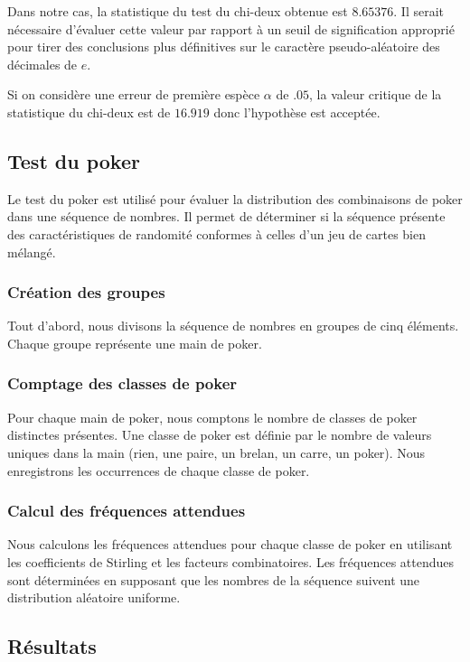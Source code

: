 \documentclass{article}
\begin{document}
Dans notre cas, la statistique du test du chi-deux obtenue est \(8.65376\). Il serait nécessaire d'évaluer cette valeur par rapport à un seuil de signification approprié pour tirer des conclusions plus définitives sur le caractère pseudo-aléatoire des décimales de \(e\).

Si on considère une erreur de première espèce $\alpha$ de \(.05\), la valeur critique de la statistique du chi-deux est de \(16.919\) donc l'hypothèse est acceptée.

\subsection{Test du poker}

Le test du poker est utilisé pour évaluer la distribution des combinaisons de poker dans une séquence de nombres. Il permet de déterminer si la séquence présente des caractéristiques de randomité conformes à celles d'un jeu de cartes bien mélangé.

\subsubsection{Création des groupes}

Tout d'abord, nous divisons la séquence de nombres en groupes de cinq éléments. Chaque groupe représente une main de poker.

\subsubsection{Comptage des classes de poker}

Pour chaque main de poker, nous comptons le nombre de classes de poker distinctes présentes. Une classe de poker est définie par le nombre de valeurs uniques dans la main (rien, une paire, un brelan, un carre, un poker). Nous enregistrons les occurrences de chaque classe de poker.

\subsubsection{Calcul des fréquences attendues}

Nous calculons les fréquences attendues pour chaque classe de poker en utilisant les coefficients de Stirling et les facteurs combinatoires. Les fréquences attendues sont déterminées en supposant que les nombres de la séquence suivent une distribution aléatoire uniforme.

\subsection{Résultats}
\end{document}
